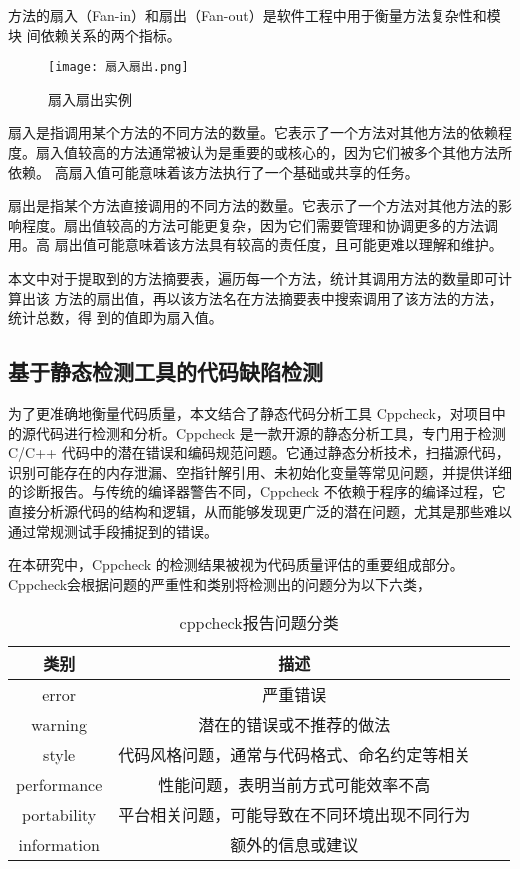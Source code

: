 方法的扇入（Fan-in）和扇出（Fan-out）是软件工程中用于衡量方法复杂性和模块
间依赖关系的两个指标。

\begin{figure}[h]
\centering
\texttt{[image: 扇入扇出.png]}
\caption{扇入扇出实例}
\end{figure}
    

扇入是指调用某个方法的不同方法的数量。它表示了一个方法对其他方法的依赖程
度。扇入值较高的方法通常被认为是重要的或核心的，因为它们被多个其他方法所依赖。
高扇入值可能意味着该方法执行了一个基础或共享的任务。


扇出是指某个方法直接调用的不同方法的数量。它表示了一个方法对其他方法的影
响程度。扇出值较高的方法可能更复杂，因为它们需要管理和协调更多的方法调用。高
扇出值可能意味着该方法具有较高的责任度，且可能更难以理解和维护。


本文中对于提取到的方法摘要表，遍历每一个方法，统计其调用方法的数量即可计算出该
方法的扇出值，再以该方法名在方法摘要表中搜索调用了该方法的方法，统计总数，得
到的值即为扇入值。

\subsection{基于静态检测工具的代码缺陷检测}

为了更准确地衡量代码质量，本文结合了静态代码分析工具 Cppcheck，对项目中的源代码进行检测和分析。Cppcheck 是一款开源的静态分析工具，专门用于检测 C/C++ 代码中的潜在错误和编码规范问题。它通过静态分析技术，扫描源代码，识别可能存在的内存泄漏、空指针解引用、未初始化变量等常见问题，并提供详细的诊断报告。与传统的编译器警告不同，Cppcheck 不依赖于程序的编译过程，它直接分析源代码的结构和逻辑，从而能够发现更广泛的潜在问题，尤其是那些难以通过常规测试手段捕捉到的错误。

在本研究中，Cppcheck 的检测结果被视为代码质量评估的重要组成部分。Cppcheck会根据问题的严重性和类别将检测出的问题分为以下六类，

\begin{table}[htbp]
\caption{cppcheck报告问题分类}
\vspace{0.5em}\centering\wuhao
\begin{tabular}{cccc}
\toprule
类别 & 描述 \\
\midrule
error &  严重错误 \\
warning & 潜在的错误或不推荐的做法 \\
style & 代码风格问题，通常与代码格式、命名约定等相关 \\
performance & 性能问题，表明当前方式可能效率不高 \\ 
portability & 平台相关问题，可能导致在不同环境出现不同行为 \\
information & 额外的信息或建议 \\ 
\bottomrule
\end{tabular}
\end{table}

